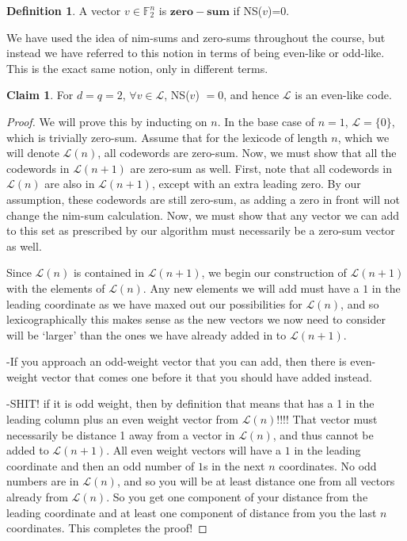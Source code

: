 \documentclass{article}
\numberwithin{theorem}{subsection}
\numberwithin{lemma}{subsection}
\theoremstyle{definition}
\numberwithin{exmp}{subsection}
\theoremstyle{definition}
\newtheorem{defn}{Definition}
\numberwithin{defn}{subsection}
\theoremstyle{definition}
\newtheorem{claim}{Claim}
\numberwithin{claim}{subsection}
\begin{document}
\begin{defn}
A vector $v\in \mathbb{F}_2^n$ is $\mathbf{zero-sum}$ if NS($v$)=0.
\end{defn}

We have used the idea of nim-sums and zero-sums throughout the course, but instead we have
referred to this notion in terms of being even-like or odd-like.  This is the
exact same notion, only in different terms.

\begin{claim}
For $d=q=2$, $\forall v\in \mathcal{L}$, NS($v$) $= 0$, and hence $\mathcal{L}$ is an even-like code.
\end{claim}

\begin{proof}
We will prove this by inducting on $n$.  In the base case of $n=1$,
$\mathcal{L}=\{0\}$, which is trivially zero-sum.  Assume that for the
lexicode of length $n$, which we will denote $\mathcal{L}(n)$, all codewords are zero-sum.  Now, we must show that all
the codewords in $\mathcal{L}(n+1)$ are zero-sum as well.  First, note that all
codewords in $\mathcal{L}(n)$ are also in $\mathcal{L}(n+1)$, except with an
extra leading zero.  By our assumption, these codewords are still zero-sum, as
adding a zero in front will not change the nim-sum calculation.
Now, we must show that any vector we can add to this set as prescribed by our
algorithm must necessarily be a zero-sum vector as well.  

Since $\mathcal{L}(n)$ is contained in $\mathcal{L}(n+1)$, we begin our construction of $\mathcal{L}(n+1)$ with the elements of $\mathcal{L}(n)$.  Any new elements
we will add must have a $1$ in the leading coordinate as we have maxed out our possibilities for $\mathcal{L}(n)$, and so lexicographically this makes sense as the new vectors we now need to consider will be `larger' than the ones
we have already added in to $\mathcal{L}(n+1)$. 

-If you approach an odd-weight vector that you can add, then there is even-weight vector that comes one before it that you should have added instead.


-SHIT! if it is odd weight, then by definition that means that has a 1 in the leading column plus an even weight vector from $\mathcal{L}(n)$!!!!  That vector must necessarily be 
distance 1 away from a vector in $\mathcal{L}(n)$, and thus cannot be added to $\mathcal{L}(n+1)$.  All even weight vectors will have a $1$ in the leading coordinate and then
an odd number of $1$s in the next $n$ coordinates.  No odd numbers are in $\mathcal{L}(n)$, and so you will be at least distance one from all vectors already from $\mathcal{L}(n)$.
So you get one component of your distance from the leading coordinate and at least one component of distance from you the last $n$ coordinates.  This completes the 
proof!
\end{proof}
\end{document}
